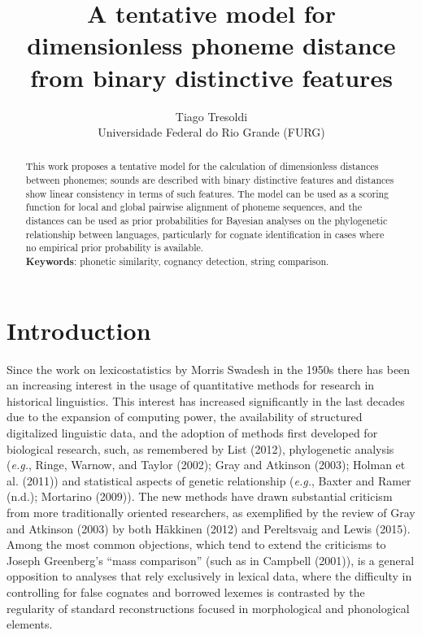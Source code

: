 \documentclass[a4paper]{article}
\begin{document}
\title{A tentative model for dimensionless phoneme distance from binary
distinctive features}
\author{
Tiago Tresoldi \\
Universidade Federal do Rio Grande (FURG) \\
\mymail
}
\maketitle

\begin{abstract}
This work proposes a tentative model for the calculation of
dimensionless distances between phonemes; sounds are described with
binary distinctive features and distances show linear consistency in
terms of such features. The model can be used as a scoring function for
local and global pairwise alignment of phoneme sequences, and the
distances can be used as prior probabilities for Bayesian analyses on
the phylogenetic relationship between languages, particularly for
cognate identification in cases where no empirical prior probability is
available. \\
\textbf{Keywords}: phonetic similarity, cognancy detection, string comparison.
\end{abstract}

\section{Introduction}\label{introduction}

Since the work on lexicostatistics by Morris Swadesh in the 1950s there
has been an increasing interest in the usage of quantitative methods for
research in historical linguistics. This interest has increased
significantly in the last decades due to the expansion of computing
power, the availability of structured digitalized linguistic data, and
the adoption of methods first developed for biological research, such,
as remembered by List (2012), phylogenetic analysis (\emph{e.g.}, Ringe,
Warnow, and Taylor (2002); Gray and Atkinson (2003); Holman et al.
(2011)) and statistical aspects of genetic relationship (\emph{e.g.},
Baxter and Ramer (n.d.); Mortarino (2009)). The new methods have drawn
substantial criticism from more traditionally oriented researchers, as
exemplified by the review of Gray and Atkinson (2003) by both H{\"a}kkinen
(2012) and Pereltsvaig and Lewis (2015). Among the most common
objections, which tend to extend the criticisms to Joseph Greenberg's ``mass comparison'' (such as in Campbell (2001)), is a general opposition to analyses that rely
exclusively in lexical data, where the difficulty in controlling for
false cognates and borrowed lexemes is contrasted by the regularity of
standard reconstructions focused in morphological and phonological
elements.
\end{document}
